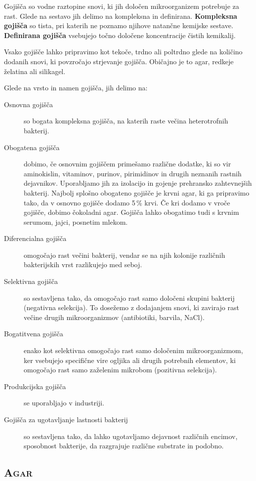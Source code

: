 \documentclass[12pt, a4paper, oneside]{report}
\begin{document}
Gojišča so vodne raztopine snovi, ki jih določen mikroorganizem potrebuje za rast. Glede na sestavo jih delimo na kompleksna in definirana. \textbf{Kompleksna gojišča} so tista, pri katerih ne poznamo njihove natančne kemijske sestave. \textbf{Definirana gojišča} vsebujejo točno določene koncentracije čistih kemikalij.

Vsako gojišče lahko pripravimo kot tekoče, trdno ali poltrdno glede na količino dodanih snovi, ki povzročajo strjevanje gojišča. Običajno je to agar, redkeje želatina ali silikagel.

Glede na vrsto in namen gojišča, jih delimo na:
\begin{description}
\item[Osnovna gojišča] so bogata kompleksna gojišča, na katerih raste večina heterotrofnih bakterij.
\item[Obogatena gojišča] dobimo, če osnovnim gojiščem primešamo različne dodatke, ki so vir aminokislin, vitaminov, purinov, pirimidinov in drugih neznanih rastnih dejavnikov. Uporabljamo jih za izolacijo in gojenje prehransko zahtevnejših bakterij. Najbolj splošno obogateno gojišče je krvni agar, ki ga pripravimo tako, da v osnovno gojišče dodamo 5\,\% krvi. Če kri dodamo v vroče gojišče, dobimo čokoladni agar. Gojišča lahko obogatimo tudi s krvnim serumom, jajci, posnetim mlekom.
\item[Diferencialna gojišča] omogočajo rast večini bakterij, vendar se na njih kolonije različnih bakterijskih vrst razlikujejo med seboj.
\item[Selektivna gojišča] so sestavljena tako, da omogočajo rast samo določeni skupini bakterij (negativna selekcija). To dosežemo z dodajanjem snovi, ki zavirajo rast večine drugih mikroorganizmov (antibiotiki, barvila, NaCl).
\item[Bogatitvena gojišča] enako kot selektivna omogočajo rast samo določenim mikroorganizmom, ker vsebujejo specifične vire ogljika ali drugih potrebnih elementov, ki omogočajo rast samo zaželenim mikrobom (pozitivna selekcija).
\item[Produkcijska gojišča] se uporabljajo v industriji.
\item[Gojišča za ugotavljanje lastnosti bakterij] so sestavljena tako, da lahko ugotavljamo dejavnost različnih encimov, sposobnost bakterije, da razgrajuje različne substrate in podobno.
\end{description}

\subsection{\textsc{Agar}}
\end{document}

